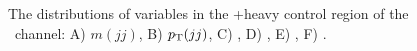 \begin{figure}[htbp]
{    
  }
  \caption[\bosZ+heavy Control Region Distributions for the \ZnnH\ Channel]{The distributions of variables in the \bosZ+heavy control region of the \ZnnH\ channel: A) $m(jj)$, B) $p_{\mathrm{T}}(jj)$, C) \btagmax, D) \btagmin, E) \pTjmax, F) \pTjmin.}
  \label{fig:CR_Znn_ZHF_1}
\end{figure}

\clearpage

